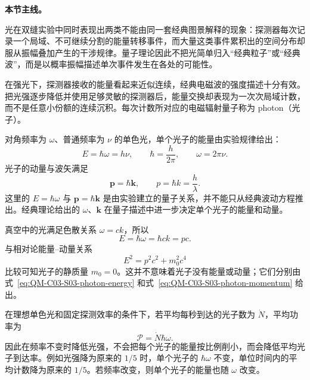 \textbf{本节主线。}

光在双缝实验中同时表现出两类不能由同一套经典图景解释的现象：探测器每次记录一个局域、不可继续分割的能量转移事件，而大量这类事件累积出的空间分布却服从振幅叠加产生的干涉规律。量子理论因此不把光简单归入“经典粒子”或“经典波”，而是以概率振幅描述单次事件发生在各处的可能性。


在强光下，探测器接收的能量看起来近似连续，经典电磁波的强度描述十分有效。把光强逐步降低并使用足够灵敏的探测器后，能量交换却表现为一次次局域计数，而不是任意小份额的连续沉积。每次计数所对应的电磁辐射量子称为 photon（光子）。

对角频率为 $\omega$、普通频率为 $\nu$ 的单色光，单个光子的能量由实验规律给出：
\begin{equation}
  \boxed{E=\hbar\omega=h\nu},
  \qquad
  \hbar=\frac{h}{2\pi},
  \qquad
  \omega=2\pi\nu.
  \label{eq:QM-C03-S03-photon-energy}
\end{equation}
光子的动量与波矢满足
\begin{equation}
  \boxed{\bm p=\hbar\bm k},
  \qquad
  p=\hbar k=\frac{h}{\lambda}.
  \label{eq:QM-C03-S03-photon-momentum}
\end{equation}
这里的 $E=\hbar\omega$ 与 $\bm p=\hbar\bm k$ 是由实验建立的量子关系，并不能只从经典波动方程推出。经典理论给出的 $\omega$、$\bm k$ 在量子描述中进一步决定单个光子的能量和动量。

真空中的光满足色散关系 $\omega=ck$，所以
\begin{equation}
  E=\hbar\omega
  =\hbar ck
  =pc.
  \label{eq:QM-C03-S03-photon-dispersion}
\end{equation}
与相对论能量--动量关系
\begin{equation}
  E^2=p^2c^2+m_0^2c^4
  \label{eq:QM-C03-S03-relativistic-energy-momentum}
\end{equation}
比较可知光子的静质量 $m_0=0$。这并不意味着光子没有能量或动量；它们分别由式~\eqref{eq:QM-C03-S03-photon-energy} 和式~\eqref{eq:QM-C03-S03-photon-momentum} 给出。

在理想单色光和固定探测效率的条件下，若平均每秒到达的光子数为 $\dot N$，平均功率为
\begin{equation}
  \boxed{\mathcal P=\dot N\hbar\omega}.
  \label{eq:QM-C03-S03-power-count-rate}
\end{equation}
因此在频率不变时降低光强，不会把每个光子的能量按比例削小，而会降低平均光子到达率。例如光强降为原来的 $1/5$ 时，单个光子的 $\hbar\omega$ 不变，单位时间内的平均计数降为原来的 $1/5$。若频率改变，则单个光子的能量也随 $\omega$ 改变。

